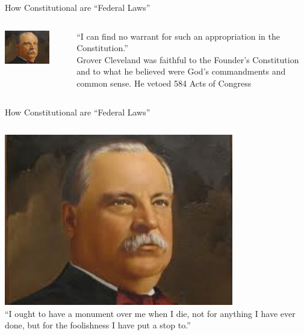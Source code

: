 \begin{frame}{How Constitutional are ``Federal Laws''}
    \begin{columns}[onlytextwidth]
            \centering
            \includegraphics[width=0.75\textwidth]{img/cleveland2.png} \\
            \pause

            ``I can find no warrant for such an appropriation in the Constitution.'' \\
            \vspace{15pt}
            Grover Cleveland was faithful to the Founder’s Constitution and to
            what he believed were God’s commandments and common sense.  He
            vetoed 584 Acts of Congress

    \end{columns}
\end{frame}

\begin{frame}{How Constitutional are ``Federal Laws''}
    \begin{columns}[onlytextwidth]
            \centering
            \includegraphics[width=0.75\textwidth]{img/cleveland2.png} \\

            ``I ought to have a monument over me when I die, not for anything I have ever done, but for the foolishness I have put a stop to.''

    \end{columns}
\end{frame}

